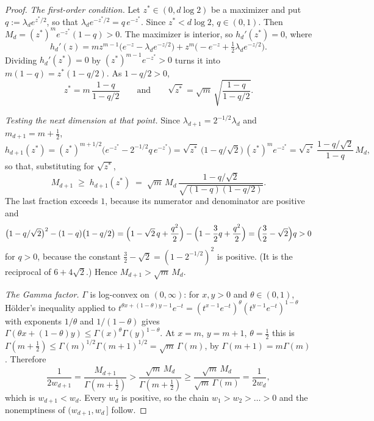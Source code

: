 \begin{proof}
\emph{The first-order condition.} Let $z^* \in (0,d\log 2)$ be a maximizer and put
$q := \lambda_d e^{z^*/2}$, so that $\lambda_d e^{-z^*/2} = q\,e^{-z^*}$. Since $z^* < d\log 2$,
$q \in (0,1)$. Then $M_d = (z^*)^m e^{-z^*}(1-q) > 0$. The maximizer is interior, so
$h_d'(z^*) = 0$, where
\[
  h_d'(z) = m z^{m-1}\bigl(e^{-z} - \lambda_d e^{-z/2}\bigr)
    + z^m\bigl(-e^{-z} + \tfrac12\lambda_d e^{-z/2}\bigr) .
\]
Dividing $h_d'(z^*) = 0$ by $(z^*)^{m-1}e^{-z^*} > 0$ turns it into $m(1-q) = z^*(1 - q/2)$. As
$1 - q/2 > 0$,
\[
  z^* = m\,\frac{1-q}{1-q/2} \qquad\text{and}\qquad
  \sqrt{z^*} = \sqrt{m}\,\sqrt{\frac{1-q}{1-q/2}} .
\]

\emph{Testing the next dimension at that point.} Since
$\lambda_{d+1} = 2^{-1/2}\lambda_d$ and $m_{d+1} = m + \tfrac12$,
\[
  h_{d+1}(z^*) = (z^*)^{m+1/2}\bigl(e^{-z^*} - 2^{-1/2}q\,e^{-z^*}\bigr)
   = \sqrt{z^*}\,\bigl(1 - q/\sqrt2\bigr)\,(z^*)^m e^{-z^*}
   = \sqrt{z^*}\,\frac{1 - q/\sqrt2}{1-q}\,M_d ,
\]
so that, substituting for $\sqrt{z^*}$,
\[
  M_{d+1} \;\ge\; h_{d+1}(z^*)
   \;=\; \sqrt{m}\,M_d\,\frac{1 - q/\sqrt2}{\sqrt{(1-q)(1-q/2)}} .
\]
The last fraction exceeds $1$, because its numerator and denominator are positive and
\[
  \bigl(1 - q/\sqrt2\bigr)^2 - (1-q)\bigl(1-q/2\bigr)
   = \Bigl(1 - \sqrt2\,q + \frac{q^2}{2}\Bigr)
     - \Bigl(1 - \frac32 q + \frac{q^2}{2}\Bigr)
   = \Bigl(\frac32 - \sqrt2\Bigr)q > 0
\]
for $q > 0$, because the constant $\tfrac32 - \sqrt2 = (1 - 2^{-1/2})^2$ is positive. (It is
the reciprocal of $6 + 4\sqrt2$.) Hence $M_{d+1} > \sqrt{m}\,M_d$.

\emph{The Gamma factor.} $\Gamma$ is log-convex on $(0,\infty)$: for $x,y > 0$ and
$\theta \in (0,1)$, H\"older's inequality applied to
$t^{\theta x + (1-\theta)y - 1}e^{-t} = (t^{x-1}e^{-t})^\theta (t^{y-1}e^{-t})^{1-\theta}$ with
exponents $1/\theta$ and $1/(1-\theta)$ gives
$\Gamma(\theta x + (1-\theta)y) \le \Gamma(x)^\theta\Gamma(y)^{1-\theta}$. At
$x = m$, $y = m+1$, $\theta = \tfrac12$ this is
$\Gamma(m + \tfrac12) \le \Gamma(m)^{1/2}\Gamma(m+1)^{1/2} = \sqrt{m}\,\Gamma(m)$, by
$\Gamma(m+1) = m\Gamma(m)$. Therefore
\[
  \frac{1}{2w_{d+1}} = \frac{M_{d+1}}{\Gamma(m + \frac12)}
   > \frac{\sqrt m\,M_d}{\Gamma(m+\frac12)}
   \ge \frac{\sqrt m\,M_d}{\sqrt m\,\Gamma(m)} = \frac{1}{2w_d} ,
\]
which is $w_{d+1} < w_d$. Every $w_d$ is positive, so the chain $w_1 > w_2 > \dots > 0$ and the
nonemptiness of $(w_{d+1},w_d\,]$ follow.
\end{proof}

